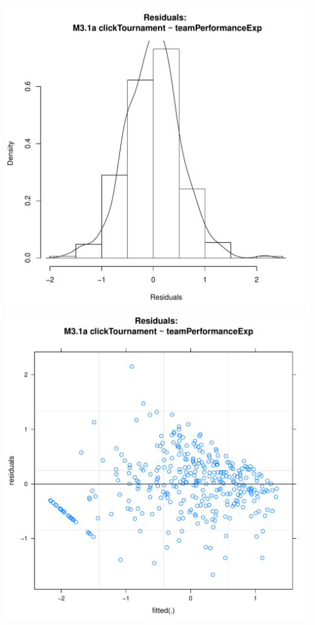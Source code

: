 \documentclass[12pt]{report}
\begin{document}
\newpage
\centering
\includegraphics[scale =.4]{../images/MLM31aHist.pdf}
\includegraphics[scale =.4]{../images/MLM31aScatter.pdf}
\end{document}
